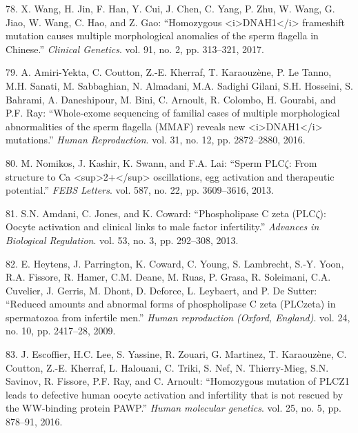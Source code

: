 \documentclass[12pt,twoside]{reedthesis}
\theoremstyle{definition}
\theoremstyle{definition}
\theoremstyle{remark}
\begin{document}
  \hypertarget{ref-Wang2017}{}
  78. X. Wang, H. Jin, F. Han, Y. Cui, J. Chen, C. Yang, P. Zhu, W. Wang,
  G. Jiao, W. Wang, C. Hao, and Z. Gao: ``Homozygous
  \textless{}i\textgreater{}DNAH1\textless{}/i\textgreater{} frameshift
  mutation causes multiple morphological anomalies of the sperm flagella
  in Chinese.'' \emph{Clinical Genetics}. vol. 91, no. 2, pp. 313--321,
  2017.
  
  \hypertarget{ref-Amiri-Yekta2016}{}
  79. A. Amiri-Yekta, C. Coutton, Z.-E. Kherraf, T. Karaouzène, P. Le
  Tanno, M.H. Sanati, M. Sabbaghian, N. Almadani, M.A. Sadighi Gilani,
  S.H. Hosseini, S. Bahrami, A. Daneshipour, M. Bini, C. Arnoult, R.
  Colombo, H. Gourabi, and P.F. Ray: ``Whole-exome sequencing of familial
  cases of multiple morphological abnormalities of the sperm flagella
  (MMAF) reveals new
  \textless{}i\textgreater{}DNAH1\textless{}/i\textgreater{} mutations.''
  \emph{Human Reproduction}. vol. 31, no. 12, pp. 2872--2880, 2016.
  
  \hypertarget{ref-Nomikos2013}{}
  80. M. Nomikos, J. Kashir, K. Swann, and F.A. Lai: ``Sperm PLC\(\zeta\):
  From structure to Ca
  \textless{}sup\textgreater{}2+\textless{}/sup\textgreater{}
  oscillations, egg activation and therapeutic potential.'' \emph{FEBS
  Letters}. vol. 587, no. 22, pp. 3609--3616, 2013.
  
  \hypertarget{ref-Amdani2013}{}
  81. S.N. Amdani, C. Jones, and K. Coward: ``Phospholipase C zeta
  (PLC\(\zeta\)): Oocyte activation and clinical links to male factor
  infertility.'' \emph{Advances in Biological Regulation}. vol. 53, no. 3,
  pp. 292--308, 2013.
  
  \hypertarget{ref-Heytens2009}{}
  82. E. Heytens, J. Parrington, K. Coward, C. Young, S. Lambrecht, S.-Y.
  Yoon, R.A. Fissore, R. Hamer, C.M. Deane, M. Ruas, P. Grasa, R.
  Soleimani, C.A. Cuvelier, J. Gerris, M. Dhont, D. Deforce, L. Leybaert,
  and P. De Sutter: ``Reduced amounts and abnormal forms of phospholipase
  C zeta (PLCzeta) in spermatozoa from infertile men.'' \emph{Human
  reproduction (Oxford, England)}. vol. 24, no. 10, pp. 2417--28, 2009.
  
  \hypertarget{ref-Escoffier2016}{}
  83. J. Escoffier, H.C. Lee, S. Yassine, R. Zouari, G. Martinez, T.
  Karaouzène, C. Coutton, Z.-E. Kherraf, L. Halouani, C. Triki, S. Nef, N.
  Thierry-Mieg, S.N. Savinov, R. Fissore, P.F. Ray, and C. Arnoult:
  ``Homozygous mutation of PLCZ1 leads to defective human oocyte
  activation and infertility that is not rescued by the WW-binding protein
  PAWP.'' \emph{Human molecular genetics}. vol. 25, no. 5, pp. 878--91,
  2016.
  
\end{document}
